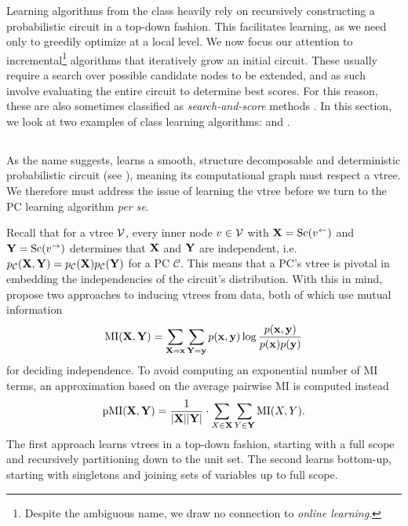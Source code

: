 Learning algorithms from the \divclass{} class heavily rely on recursively constructing a
probabilistic circuit in a top-down fashion. This facilitates learning, as we need only to greedily
optimize at a local level. We now focus our attention to incremental\footnote{Despite the ambiguous
name, we draw no connection to \emph{online learning}.} algorithms that iteratively grow an initial
circuit. These usually require a search over possible candidate nodes to be extended, and as such
involve evaluating the entire circuit to determine best scores. For this reason, these are also
sometimes classified as \emph{search-and-score} methods \citep{teyssier05}. In this section, we
look at two examples of \incrclass{} class learning algorithms:  and
.

\subsection{}
\label{sec:learnpsdd}

As the name suggests,  \citep{liang17} learns a smooth, structure decomposable
and deterministic probabilistic circuit (see ), meaning its
computational graph must respect a vtree. We therefore must address the issue of learning the vtree
before we turn to the PC learning algorithm \emph{per se}.

Recall that for a vtree $\operatorname{\mathcal{V}}$, every inner node $v\in\operatorname{\mathcal{V}}$ with $\mathbf{X}=\operatorname*{\normalfont{Sc}}(v^\gets)$ and
$\mathbf{Y}=\operatorname*{\normalfont{Sc}}(v^\to)$ determines that $\mathbf{X}$ and $\mathbf{Y}$ are independent, i.e.\
$p_\mathcal{C}(\mathbf{X},\mathbf{Y})=p_\mathcal{C}(\mathbf{X}) p_\mathcal{C}(\mathbf{Y})$ for a PC
$\mathcal{C}$. This means that a PC's vtree is pivotal in embedding the independencies of the
circuit's distribution. With this in mind, \citet{liang17} propose two approaches to inducing
vtrees from data, both of which use mutual information
\begin{equation}
  \operatorname{\normalfont{MI}}(\mathbf{X},\mathbf{Y})=\sum_{\mathbf{X}=\mathbf{x}}\sum_{\mathbf{Y}=\mathbf{y}}p(\mathbf{x},\mathbf{y})\log\frac{p(\mathbf{x},\mathbf{y})}{p(\mathbf{x})p(\mathbf{y})}
\end{equation}
for deciding independence. To avoid computing an exponential number of MI terms, an approximation
based on the average pairwise MI is computed instead
\begin{equation}
  \operatorname{\normalfont{pMI}}(\mathbf{X},\mathbf{Y})=\frac{1}{|\mathbf{X}||\mathbf{Y}|}\cdot\sum_{X\in\mathbf{X}}\sum_{Y\in\mathbf{Y}}\operatorname{\normalfont{MI}}(X,Y).
\end{equation}
The first approach learns vtrees in a top-down fashion, starting with a full scope and recursively
partitioning down to the unit set. The second learns bottom-up, starting with singletons and
joining sets of variables up to full scope.


